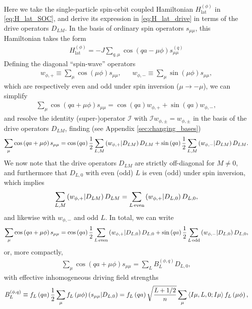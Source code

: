 \documentclass[nofootinbib,notitlepage,11pt]{revtex4-2}
\renewcommand{\t}{\text} %
\newcommand{\f}[2]{\dfrac{#1}{#2}} %
\newcommand{\p}[1]{\left(#1\right)} %
\newcommand{\bk}{\Braket} %
\newcommand{\1}{\mathds{1}}
\newcommand{\I}{\mathcal{I}}
\def\obk#1{\mathinner{({#1})}}
\begin{document}
Here we take the single-particle spin-orbit coupled Hamiltonian
$H_{\t{lat}}^{(\phi)}$ in \eqref{eq:H_lat_SOC}, and derive its
expression in \eqref{eq:H_lat_drive} in terms of the drive operators
$D_{LM}$.  In the basis of ordinary spin operators $s_{\mu\mu}$, this
Hamiltonian takes the form
\begin{align}
  H_{\t{lat}}^{(\phi)}
  = -J \sum_{q,\mu} \cos\p{qa-\mu\phi} s_{\mu\mu}^{(q)}
  \label{eq:H_lat_spin}
\end{align}
Defining the diagonal ``spin-wave'' operators
\begin{align}
  w_{\phi,+} \equiv \sum_\mu \cos\p{\mu\phi} s_{\mu\mu},
  &&
  w_{\phi,-} \equiv \sum_\mu \sin\p{\mu\phi} s_{\mu\mu},
\end{align}
which are respectively even and odd under spin inversion
($\mu\to-\mu$), we can simplify
\begin{align}
  \sum_\mu \cos\p{qa+\mu\phi} s_{\mu\mu}
  = \cos\p{qa} w_{\phi,+} + \sin\p{qa} w_{\phi,-},
\end{align}
and resolve the identity (super-)operator $\I$ with
$\I w_{\phi,\pm} = w_{\phi,\pm}$ in the basis of the drive
operators $D_{LM}$, finding (see Appendix \ref{sec:changing_bases})
\begin{align}
  \sum_\mu \cos\p{qa+\mu\phi} s_{\mu\mu}
  = \cos\p{qa} \f12 \sum_{L,M} \obk{w_{\phi,+}|D_{LM}} D_{LM}
  + \sin\p{qa} \f12 \sum_{L,M} \obk{w_{\phi,-}|D_{LM}} D_{LM}.
\end{align}
We now note that the drive operators $D_{LM}$ are strictly
off-diagonal for $M\ne0$, and furthermore that $D_{L,0}$ with even
(odd) $L$ is even (odd) under spin inversion, which implies
\begin{align}
  \sum_{L,M} \obk{w_{\phi,+}|D_{LM}} D_{LM}
  = \sum_{L\,\t{even}} \obk{w_{\phi,+}|D_{L,0}} D_{L,0},
\end{align}
and likewise with $w_{\phi,-}$ and odd $L$.  In total, we can
write
\begin{align}
  \sum_\mu \cos\p{qa+\mu\phi} s_{\mu\mu}
  = \cos\p{qa} \f12 \sum_{L\,\t{even}}
  \obk{w_{\phi,+}|D_{L,0}} D_{L,0}
  + \sin\p{qa} \f12 \sum_{L\,\t{odd}}
  \obk{w_{\phi,-}|D_{L,0}} D_{L,0},
\end{align}
or, more compactly,
\begin{align}
  \sum_\mu \cos\p{qa+\mu\phi} s_{\mu\mu}
  = \sum_L B_L^{(\phi,q)} D_{L,0},
  \label{eq:compact_SOC_drive}
\end{align}
with effective inhomogeneous driving field strengths
\begin{align}
  B_L^{(\phi,q)}
  \equiv f_L\p{qa} \f12
  \sum_\mu f_L\p{\mu\phi} \obk{s_{\mu\mu}|D_{L,0}}
  = f_L\p{qa} \sqrt{\f{L+1/2}{n}}
  \sum_\mu \bk{I\mu,L,0;I\mu} f_L\p{\mu\phi},
\end{align}
\end{document}
